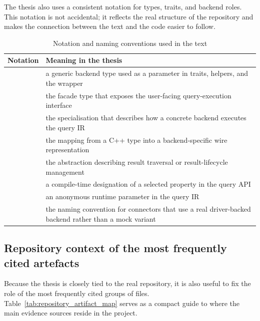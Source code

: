 The thesis also uses a consistent notation for types, traits, and backend roles. This notation is not accidental; it reflects the real structure of the repository and makes the connection between the text and the code easier to follow.

\begin{table}[H]
\centering
\small
\caption{Notation and naming conventions used in the text}
\label{tab:naming_conventions_glossary}
\begin{tabularx}{\textwidth}{L{3.6cm}Y}
\toprule
\textbf{Notation} & \textbf{Meaning in the thesis} \\
\midrule
{} & a generic backend type used as a parameter in traits, helpers, and the  wrapper \\
 & the facade type that exposes the user-facing query-execution interface \\
 & the specialisation that describes how a concrete backend executes the query IR \\
 & the mapping from a C++ type into a backend-specific wire representation \\
 & the abstraction describing result traversal or result-lifecycle management \\
 & a compile-time designation of a selected property in the query API \\
 & an anonymous runtime parameter in the query IR \\
 & the naming convention for connectors that use a real driver-backed backend rather than a mock variant \\
\bottomrule
\end{tabularx}
\end{table}

\subsection{Repository context of the most frequently cited artefacts}

Because the thesis is closely tied to the real repository, it is also useful to fix the role of the most frequently cited groups of files. Table~\ref{tab:repository_artifact_map} serves as a compact guide to where the main evidence sources reside in the project.

